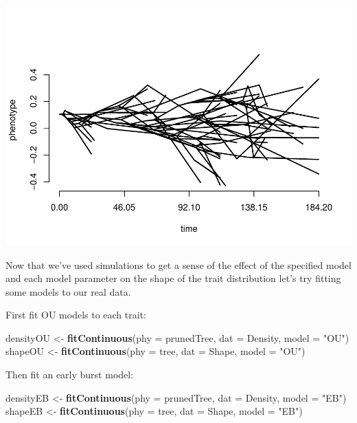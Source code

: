 \documentclass[]{article}
\newenvironment{Shaded}{\begin{snugshade}}{\end{snugshade}}
\newcommand{\KeywordTok}[1]{\textcolor[rgb]{0.13,0.29,0.53}{\textbf{#1}}}
\newcommand{\DataTypeTok}[1]{\textcolor[rgb]{0.13,0.29,0.53}{#1}}
\newcommand{\StringTok}[1]{\textcolor[rgb]{0.31,0.60,0.02}{#1}}
\newcommand{\NormalTok}[1]{#1}
\begin{document}
\includegraphics{module_08_files/figure-latex/unnamed-chunk-18-2.pdf}

Now that we've used simulations to get a sense of the effect of the
specified model and each model parameter on the shape of the trait
distribution let's try fitting some models to our real data.

First fit OU models to each trait:

\begin{Shaded}
\begin{Highlighting}[]
\NormalTok{densityOU <-}\StringTok{ }\KeywordTok{fitContinuous}\NormalTok{(}\DataTypeTok{phy =}\NormalTok{ prunedTree, }\DataTypeTok{dat =}\NormalTok{ Density, }\DataTypeTok{model =} \StringTok{"OU"}\NormalTok{)}
\NormalTok{shapeOU <-}\StringTok{ }\KeywordTok{fitContinuous}\NormalTok{(}\DataTypeTok{phy =}\NormalTok{ tree, }\DataTypeTok{dat =}\NormalTok{ Shape, }\DataTypeTok{model =} \StringTok{"OU"}\NormalTok{)}
\end{Highlighting}
\end{Shaded}

Then fit an early burst model:

\begin{Shaded}
\begin{Highlighting}[]
\NormalTok{densityEB <-}\StringTok{ }\KeywordTok{fitContinuous}\NormalTok{(}\DataTypeTok{phy =}\NormalTok{ prunedTree, }\DataTypeTok{dat =}\NormalTok{ Density, }\DataTypeTok{model =} \StringTok{"EB"}\NormalTok{)}
\NormalTok{shapeEB <-}\StringTok{ }\KeywordTok{fitContinuous}\NormalTok{(}\DataTypeTok{phy =}\NormalTok{ tree, }\DataTypeTok{dat =}\NormalTok{ Shape, }\DataTypeTok{model =} \StringTok{"EB"}\NormalTok{)}
\end{Highlighting}
\end{Shaded}
\end{document}
